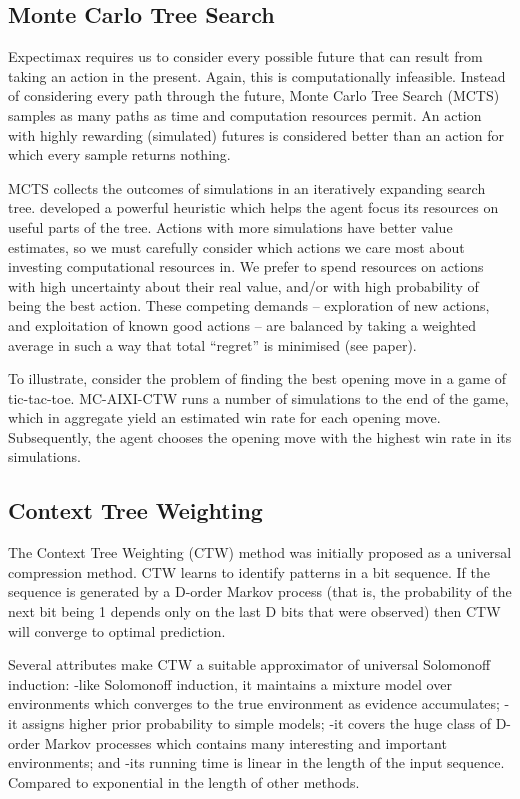 \documentclass{article}
\theoremstyle{definition}
\newtheorem{primary statistics}[definition]{Primary Statistics}
\newtheorem{auxiliary statistics}[definition]{Auxiliary Statistics}
\begin{document}
\subsection{Monte Carlo Tree Search}
Expectimax requires us to consider every possible future that can result from taking an action in the present. Again, this is computationally infeasible. Instead of considering every path through the future, Monte Carlo Tree Search (MCTS) samples as many paths as time and computation resources permit. An action with highly rewarding (simulated) futures is considered better than an action for which every sample returns nothing.

MCTS collects the outcomes of simulations in an iteratively expanding search tree.  \citep{kocsis2006bandit} developed a powerful heuristic which helps the agent focus its resources on useful parts of the tree. Actions with more simulations have better value estimates, so we must carefully consider which actions we care most about investing computational resources in. We prefer to spend resources on actions with high uncertainty about their real value, and/or with high probability of being the best action. These competing demands -- exploration of new actions, and exploitation of known good actions -- are balanced by taking a weighted average in such a way that total “regret” is minimised (see paper).

To illustrate, consider the problem of finding the best opening move in a game of tic-tac-toe. MC-AIXI-CTW runs a number of simulations to the end of the game, which in aggregate yield an estimated win rate for each opening move. Subsequently, the agent chooses the opening move with the highest win rate in its simulations.

\subsection{Context Tree Weighting}
The Context Tree Weighting (CTW) method was initially proposed as a universal compression method. CTW learns to identify patterns in a bit sequence. If the sequence is generated by a D-order Markov process (that is, the probability of the next bit being 1 depends only on the last D bits that were observed) then CTW will converge to optimal prediction. 

Several attributes make CTW a suitable approximator of universal Solomonoff induction:
-like Solomonoff induction, it maintains a mixture model over environments which converges to the true environment as evidence accumulates;
-it assigns higher prior probability to simple models;
-it covers the huge class of D-order Markov processes which contains many interesting and important environments; and
-its running time is linear in the length of the input sequence. Compared to exponential in the length of other methods.
\end{document}
